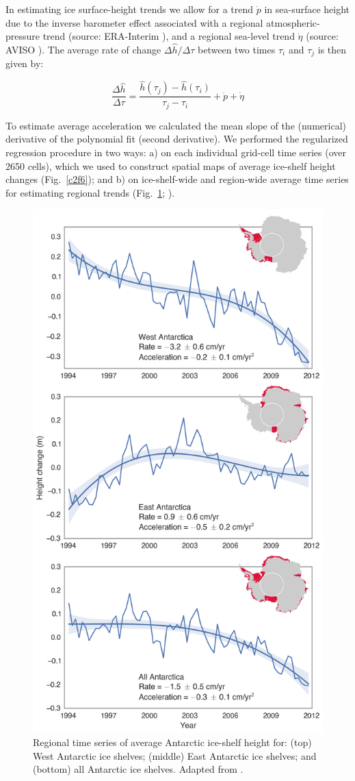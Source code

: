 In estimating ice surface-height trends we allow for a trend $\dot p$ in sea-surface height due to the inverse barometer effect associated with a regional atmospheric-pressure trend \parencite{Padman2003} (source: ERA-Interim \parencite{Dee2011}), and a regional sea-level trend $\dot \eta$ (source: AVISO \parencite{LeTraon1998}). The average rate of change $\Delta \hat h/\Delta \tau$ between two times $\tau_i$ and $\tau_j$ is then given by:

\begin{equation}
  \frac{\Delta \hat h}{\Delta \tau} = 
    \frac{\hat h(\tau_j) - \hat h(\tau_i)}{\tau_j - \tau_i}
    + \dot p + \dot \eta
  \label{c2e6}
\end{equation}


To estimate average acceleration we calculated the mean slope of the (numerical) derivative of the polynomial fit (second derivative). We performed the regularized regression procedure in two ways: a) on each individual grid-cell time series (over 2650 cells), which we used to construct spatial maps of average ice-shelf height changes (Fig.~\ref{c2f6}); and b) on ice-shelf-wide and region-wide average time series for estimating regional trends (Fig.~\ref{c2f7}; \parencite{Paolo2015}). 


\begin{figure}[!ht]
  \centering
  \includegraphics[width=.71\textwidth]{img/tseries_v4.png}
  \caption[Regional time series of average ice-shelf height]{
  Regional time series of average Antarctic ice-shelf height for: (top) West Antarctic ice shelves; (middle) East Antarctic ice shelves; and (bottom) all Antarctic ice shelves. Adapted from \textcite{Paolo2015}.
  } 
  \label{c2f7}
\end{figure}


